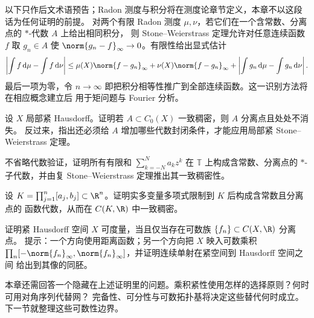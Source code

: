 以下只作后文术语预告；Radon 测度与积分将在测度论章节定义，本章不以这段话为任何证明的前提。
对两个有限 Radon 测度 $\mu,\nu$，若它们在一个含常数、分离点的 $*$-代数 $A$ 上给出相同积分，
则 Stone--Weierstrass 定理允许对任意连续函数 $f$ 取 $g_n\in A$ 使
$\norm{g_n-f}_\infty\to0$。有限性给出显式估计
\[
 \left|\int f\,\mathrm d\mu-\int f\,\mathrm d\nu\right|
 \le \mu(X)\norm{f-g_n}_\infty
     +\nu(X)\norm{f-g_n}_\infty
     +\left|\int g_n\,\mathrm d\mu-\int g_n\,\mathrm d\nu\right|.
\]
最后一项为零，令 $n\to\infty$ 即把积分相等性推广到全部连续函数。这一识别方法将在相应概念建立后
用于矩问题与 Fourier 分析。

\begin{exercise}[稠密性的必要条件]
设 $X$ 局部紧 Hausdorff。证明若 $A\subset C_0(X)$ 一致稠密，则 $A$ 分离点且处处不消失。
反过来，指出还必须给 $A$ 增加哪些代数封闭条件，才能应用局部紧 Stone--Weierstrass 定理。
\end{exercise}

\begin{exercise}[三角多项式]
不省略代数验证，证明所有有限和 $\sum_{k=-N}^Na_kz^k$ 在 $\mathbb T$ 上构成含常数、分离点的
$*$-子代数，并由复 Stone--Weierstrass 定理推出其一致稠密性。
\end{exercise}

\begin{exercise}[多变量多项式]
设 $K=\prod_{j=1}^n[a_j,b_j]\subset\R^n$。证明实多变量多项式限制到 $K$ 后构成含常数且分离点的
函数代数，从而在 $C(K,\R)$ 中一致稠密。
\end{exercise}

\begin{exercise}[可数分离族与可度量化]
证明紧 Hausdorff 空间 $X$ 可度量，当且仅当存在可数族 $\{f_n\}\subset C(X,\R)$ 分离点。
提示：一个方向使用距离函数；另一个方向把 $X$ 映入可数乘积
$\prod_n[-\norm{f_n}_\infty,\norm{f_n}_\infty]$，并证明连续单射在紧空间到 Hausdorff 空间之间
给出到其像的同胚。
\end{exercise}

本章还需回答一个隐藏在上述证明里的问题。乘积紧性使用怎样的选择原则？何时可用对角序列代替网？
完备性、可分性与可数拓扑基将决定这些替代何时成立。下一节就整理这些可数性边界。
